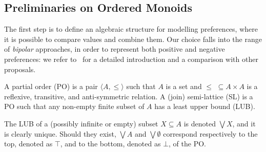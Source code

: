 \documentclass{llncs}
\newcommand{\comment}[1]{}
\def\monid{{\mathbf 0}}
\def\monid{\mathbf{1}}
\begin{document}
\subsection{Preliminaries on Ordered Monoids}\label{sec:lem}

The first step is to define an algebraic structure for modelling preferences,
where it is possible to compare values and combine them.
Our choice falls into the range of \emph{bipolar} approaches, in order to represent both positive and negative preferences: 
we refer to~\cite{ipl17} for a detailed introduction and a comparison with other proposals.

\begin{definition}
	A partial order (PO) is a pair $\langle A, \leq \rangle$ such that
	$A$ is a set and 
	$\leq \,\,\subseteq A \times A$ is a reflexive, transitive, and
	anti-symmetric relation.
	A (join) semi-lattice (SL) is a PO such that any non-empty finite  subset of $A$ has a
	least upper bound (LUB).
\end{definition}

The LUB of a (possibly infinite or empty) subset $X \subseteq A$ is denoted $\bigvee X$, and it is clearly unique.
Should  they exist, $\bigvee A$ and $\bigvee \emptyset$ correspond respectively to the top, denoted as 
$\top$, and to the bottom, denoted as $\bot$, of the PO.

\comment{\begin{definition}[Compact elements]
An element $a \in A$ is compact 
if whenever $a \leq \bigvee Y$ for some $Y \subseteq A$
there exists a finite subset
$X \subseteq Y$ such that $a \leq \bigvee X$.
%
\end{definition}

We let $A^C \subseteq A$ denote the set of compact elements of ${\mathbb C}$. }

%
\end{document}
